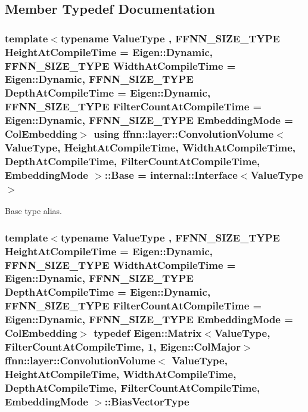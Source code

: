 \subsection{Member Typedef Documentation}
\hypertarget{classffnn_1_1layer_1_1_convolution_volume_a2f94a7f13a3236ad743973de4bf1f555}{
\subsubsection[{Base}]{\setlength{\rightskip}{0pt plus 5cm}template$<$typename Value\-Type , F\-F\-N\-N\-\_\-\-S\-I\-Z\-E\-\_\-\-T\-Y\-P\-E Height\-At\-Compile\-Time = Eigen\-::\-Dynamic, F\-F\-N\-N\-\_\-\-S\-I\-Z\-E\-\_\-\-T\-Y\-P\-E Width\-At\-Compile\-Time = Eigen\-::\-Dynamic, F\-F\-N\-N\-\_\-\-S\-I\-Z\-E\-\_\-\-T\-Y\-P\-E Depth\-At\-Compile\-Time = Eigen\-::\-Dynamic, F\-F\-N\-N\-\_\-\-S\-I\-Z\-E\-\_\-\-T\-Y\-P\-E Filter\-Count\-At\-Compile\-Time = Eigen\-::\-Dynamic, F\-F\-N\-N\-\_\-\-S\-I\-Z\-E\-\_\-\-T\-Y\-P\-E Embedding\-Mode = Col\-Embedding$>$ using {\bf ffnn\-::layer\-::\-Convolution\-Volume}$<$ Value\-Type, Height\-At\-Compile\-Time, Width\-At\-Compile\-Time, Depth\-At\-Compile\-Time, Filter\-Count\-At\-Compile\-Time, {\bf Embedding\-Mode} $>$\-::{\bf Base} =  {\bf internal\-::\-Interface}$<$Value\-Type$>$}}\label{classffnn_1_1layer_1_1_convolution_volume_a2f94a7f13a3236ad743973de4bf1f555}


Base type alias. 

\hypertarget{classffnn_1_1layer_1_1_convolution_volume_a590c7ebb2448c2636252101529337928}{
\subsubsection[{Bias\-Vector\-Type}]{\setlength{\rightskip}{0pt plus 5cm}template$<$typename Value\-Type , F\-F\-N\-N\-\_\-\-S\-I\-Z\-E\-\_\-\-T\-Y\-P\-E Height\-At\-Compile\-Time = Eigen\-::\-Dynamic, F\-F\-N\-N\-\_\-\-S\-I\-Z\-E\-\_\-\-T\-Y\-P\-E Width\-At\-Compile\-Time = Eigen\-::\-Dynamic, F\-F\-N\-N\-\_\-\-S\-I\-Z\-E\-\_\-\-T\-Y\-P\-E Depth\-At\-Compile\-Time = Eigen\-::\-Dynamic, F\-F\-N\-N\-\_\-\-S\-I\-Z\-E\-\_\-\-T\-Y\-P\-E Filter\-Count\-At\-Compile\-Time = Eigen\-::\-Dynamic, F\-F\-N\-N\-\_\-\-S\-I\-Z\-E\-\_\-\-T\-Y\-P\-E Embedding\-Mode = Col\-Embedding$>$ typedef Eigen\-::\-Matrix$<$Value\-Type, Filter\-Count\-At\-Compile\-Time, 1, Eigen\-::\-Col\-Major$>$ {\bf ffnn\-::layer\-::\-Convolution\-Volume}$<$ Value\-Type, Height\-At\-Compile\-Time, Width\-At\-Compile\-Time, Depth\-At\-Compile\-Time, Filter\-Count\-At\-Compile\-Time, {\bf Embedding\-Mode} $>$\-::{\bf Bias\-Vector\-Type}}}\label{classffnn_1_1layer_1_1_convolution_volume_a590c7ebb2448c2636252101529337928}


